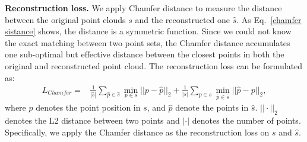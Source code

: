 \documentclass[journal]{IEEEtran}
\begin{document}
\textbf{Reconstruction loss.}  
We apply Chamfer distance to measure the distance between the original point clouds $s$ and the reconstructed one $\hat{s}$. As Eq.~\ref{chamfer sistance} shows, the distance is a symmetric function. Since we could not know the exact matching between two point sets, the Chamfer distance accumulates one sub-optimal but effective distance between the closest points in both the original and reconstructed point cloud. The reconstruction loss can be formulated as:
    {\setlength\abovedisplayskip{0.15cm}
     \setlength\belowdisplayskip{0.15cm}
    \begin{equation}
        \begin{split}
            L_{Chamfer} = & \frac{1}{|\hat{s}|} \sum_{\hat{p}\in \hat{s}} \mathop{\min}_{p\in s} {||p-\hat{p}||}_2 + \frac{1}{|s|} \sum_{p\in s} \mathop{\min}_{\hat{p}\in \hat{s}} {||\hat{p} - p||}_2,
        \end{split}
        \label{chamfer sistance}
    \end{equation}
    }
where $p$ denotes the point position in $s$, and $\hat{p}$ denote the points in $\hat{s}$. $||\cdot||_2$ denotes the L2 distance between two points and $|\cdot|$ denotes the number of points. 
Specifically, we apply the Chamfer distance as the reconstruction loss on $s$ and $\hat{s}$. 
\end{document}
